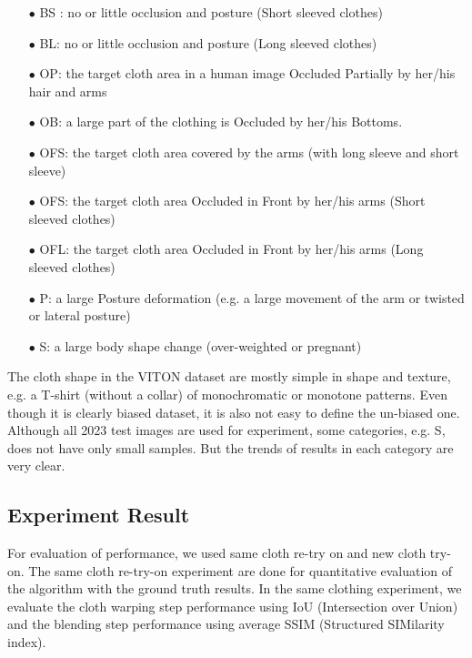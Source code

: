 \begin{itemize}

\item[$\bullet$] BS : no or little occlusion and posture (Short sleeved clothes)
\item[$\bullet$] BL: no or little occlusion and posture (Long sleeved clothes)
\item[$\bullet$] OP: the target cloth area in a human image Occluded Partially by her/his hair and arms
\item[$\bullet$] OB: a large part of the clothing is Occluded by her/his Bottoms.
\item[$\bullet$] OFS: the target cloth area covered by the arms (with long sleeve and short sleeve)
\item[$\bullet$] OFS: the target cloth area Occluded in Front by her/his arms (Short sleeved clothes)
\item[$\bullet$] OFL: the target cloth area Occluded in Front by her/his arms (Long sleeved clothes)

\item[$\bullet$] P:  a large Posture deformation (e.g. a large movement of the arm or twisted or lateral posture)
\item[$\bullet$] S:  a large body shape change  (over-weighted or pregnant)

\end{itemize}

The cloth shape in the VITON dataset are mostly simple in shape and texture, e.g. a T-shirt (without a collar) of  monochromatic or monotone patterns. Even though it is clearly biased dataset, it is also not easy to define the un-biased one. Although all 2023 test images are used for experiment, some categories, e.g. S, does not have only small samples. But the trends of results in each category are very clear. 

 
\subsection{Experiment Result} 


For evaluation of performance, we used same cloth re-try on and new cloth try-on. 
The same cloth re-try-on experiment are done for quantitative evaluation of the algorithm with the ground truth results. In the same clothing experiment, we evaluate the cloth warping step performance using IoU (Intersection over Union) and the blending step performance using average SSIM (Structured SIMilarity index).

